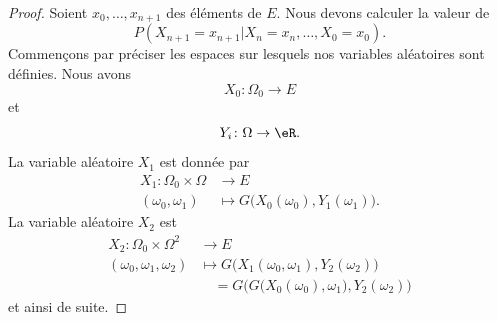 \begin{proof}
	Soient \( x_0,\ldots, x_{n+1}\) des éléments de \( E\). Nous devons calculer la valeur de
	\begin{equation}
		P(X_{n+1}=x_{n+1}|X_n=x_n,\ldots, X_0=x_0).
	\end{equation}
	Commençons par préciser les espaces sur lesquels nos variables aléatoires sont définies. Nous avons
	\begin{equation}
		X_0\colon \Omega_0\to E
	\end{equation}
	et
	\begin{equation}
		Y_i\colon \Omega\to \eR.
	\end{equation}
	La variable aléatoire \( X_1\) est donnée par
	\begin{equation}
		\begin{aligned}
			X_1\colon \Omega_0\times \Omega & \to E                                             \\
			(\omega_0,\omega_1)             & \mapsto G\big( X_0(\omega_0),Y_1(\omega_1) \big).
		\end{aligned}
	\end{equation}
	La variable aléatoire \( X_2\) est
	\begin{equation}
		\begin{aligned}
			X_2\colon \Omega_0\times \Omega^2 & \to E                                                                \\
			(\omega_0,\omega_1,\omega_2)      & \mapsto G\big( X_1(\omega_0,\omega_1),Y_2(\omega_2) \big)            \\
			                                  & \quad=G\Big( G\big( X_0(\omega_0),\omega_1 \big),Y_2(\omega_2) \Big)
		\end{aligned}
	\end{equation}
	et ainsi de suite.


\end{proof}
